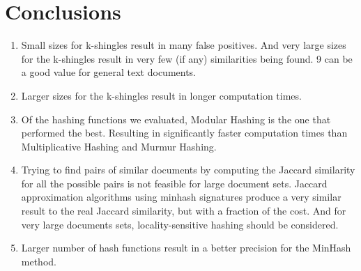 \documentclass[12pt]{article}
\begin{document}
\clearpage
\section{Conclusions}

\begin{enumerate}
\item Small sizes for k-shingles result in many false positives. And very large sizes for the k-shingles result in very few (if any) similarities being found. 9 can be a good value for general text documents.
\item Larger sizes for the k-shingles result in longer computation times.
\item Of the hashing functions we evaluated, Modular Hashing is the one that performed the best. Resulting in significantly faster computation times than Multiplicative Hashing and Murmur Hashing.
\item Trying to find pairs of similar documents by computing the Jaccard similarity for all the possible pairs is not feasible for large document sets. Jaccard approximation algorithms using minhash signatures produce a very similar result to the real Jaccard similarity, but with a fraction of the cost. And for very large documents sets, locality-sensitive hashing should be considered.
\item Larger number of hash functions result in a better precision for the MinHash method.

\end{enumerate}

\end{document}
